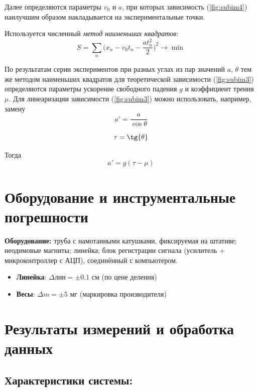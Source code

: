 \documentclass[
	a4paper, %
	12pt, %
]{article}
\begin{document}
	Далее определяются параметры $v_0$ и $a$, при которых зависимость (\ref{fig:subim4}) наилучшим образом накладывается на экспериментальные точки.
	
	Используется численный \textit{метод наименьших квадратов}:
	\begin{equation}
		S = \sum_{n}\big(x_n - v_{0}t_{n} - \frac{at_{n}^{2}}{2}\big)^2 \rightarrow \min
	\end{equation}
	
	По результатам серии экспериментов при разных углах из пар значений {$a$, $\theta$} тем же методом наименьших квадратов для теоретической зависимости (\ref{fig:subim3}) определяются параметры ускорение свободного падения $g$ и коэффициент трения $\mu$.
	Для линеаризации зависимости (\ref{fig:subim3}) можно использовать, например, замену
	\begin{equation}
		a' = \frac{a}{\cos{\theta}}
	\end{equation}
	
	\begin{equation}
		\tau = \tg{\theta}
	\end{equation}
	
	Тогда
	\begin{equation}
		a' = g(\tau - \mu)
	\end{equation}
	
	\section{Оборудование и инструментальные погрешности}
	\textbf{Оборудование:} труба с намотанными катушками, фиксируемая на штативе; неодимовые магниты; линейка; блок регистрации сигнала (усилитель + микроконтроллер с АЦП), соединённый с компьютером.
	\begin{itemize}
		\item \textbf{Линейка}: $\Delta \text{лин} = \pm0.1$ см (по цене деления)
		\item \textbf{Весы}: $\Delta m = \pm{5}$ мг (маркировка производителя)
	\end{itemize}
	
	\newpage
	
	\section{Результаты измерений и обработка данных}
	
	\subsection{Характеристики системы:}
	
\end{document}
